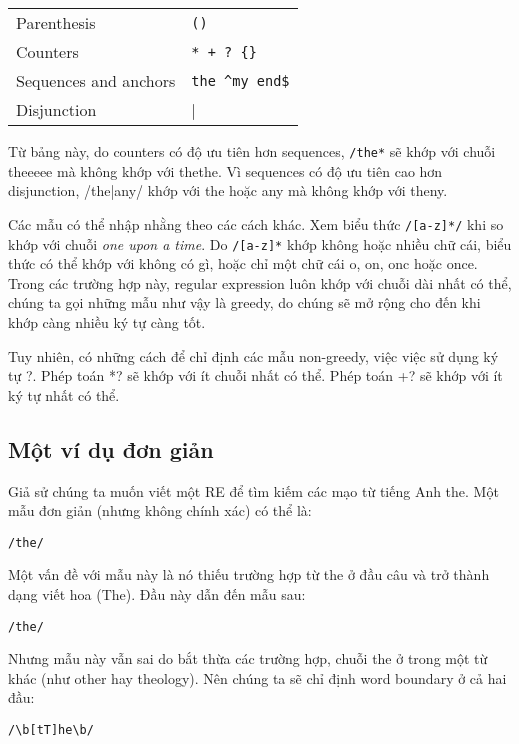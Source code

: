 \begin{center}
\begin{tabular}{ l l }
	 Parenthesis & \verb|()| \\
	 Counters  & \verb|* + ? {}| \\
	 Sequences and anchors & \verb|the ^my end$| \\
	 Disjunction & \verb||| \\
\end{tabular}
\end{center}

Từ bảng này, do counters có độ ưu tiên hơn sequences, \verb|/the*| sẽ khớp với chuỗi theeeee mà không khớp với thethe. Vì sequences có độ ưu tiên cao hơn disjunction, /the|any/ khớp với the hoặc any mà không khớp với theny.

Các mẫu có thể nhập nhằng theo các cách khác. Xem biểu thức \verb|/[a-z]*/| khi so khớp với chuỗi \textit{one upon a time}. Do \verb|/[a-z]*| khớp không hoặc nhiều chữ cái, biểu thức có thể khớp với không có gì, hoặc chỉ một chữ cái o, on, onc hoặc once. Trong các trường hợp này, regular expression luôn khớp với chuỗi dài nhất có thể, chúng ta gọi những mẫu như vậy là greedy, do chúng sẽ mở rộng cho đến khi khớp càng nhiều ký tự càng tốt.

Tuy nhiên, có những cách để chỉ định các mẫu non-greedy, việc việc sử dụng ký tự ?. Phép toán *? sẽ khớp với ít chuỗi nhất có thể. Phép toán +? sẽ khớp với ít ký tự nhất có thể.

\subsection{Một ví dụ đơn giản}

Giả sử chúng ta muốn viết một RE để tìm kiếm các mạo từ tiếng Anh the. Một mẫu đơn giản (nhưng không chính xác) có thể là:

\vspace{0.6em}

\noindent \verb|/the/|

\vspace{0.6em}

Một vấn đề với mẫu này là nó thiếu trường hợp từ the ở đầu câu và trở thành dạng viết hoa (The). Đầu này dẫn đến mẫu sau:

\vspace{0.6em}

\noindent \verb|/the/|

\vspace{0.6em}

Nhưng mẫu này vẫn sai do bắt thừa các trường hợp, chuỗi the ở trong một từ khác (như other hay theology). Nên chúng ta sẽ chỉ định word boundary ở cả hai đầu:

\vspace{0.6em}

\noindent \verb|/\b[tT]he\b/|

\vspace{0.6em}








